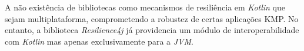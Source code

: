 A não existência de bibliotecas como mecanismos de resiliência em \textit{Kotlin} que sejam multiplataforma, comprometendo a robustez de certas aplicações KMP. No entanto, a biblioteca \textit{Resilience4j} já providencia um módulo de interoperabilidade com \textit{Kotlin} mas apenas exclusivamente para a \textit{JVM}.
